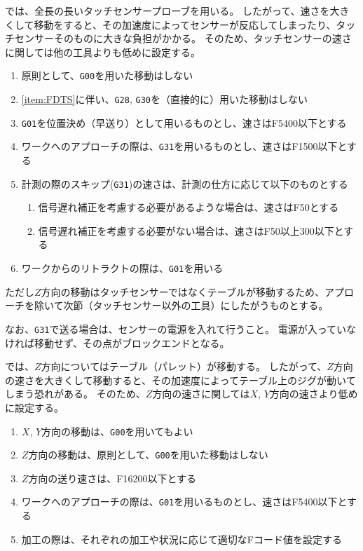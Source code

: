 \DMname では、全長の長いタッチセンサープローブを用いる。
したがって、速さを大きくして移動をすると、その加速度によってセンサーが反応してしまったり、タッチセンサーそのものに大きな負担がかかる。
そのため、タッチセンサーの速さに関しては他の工具よりも低めに設定する。
\begin{enumerate}[label=\Roman*., ref=\Roman*]
\item \label{item:FDTS} 原則として、\verb|G00|を用いた移動はしない
\item \ref{item:FDTS}に伴い、\verb|G28|, \verb|G30|を（直接的に）用いた移動はしない
\item \verb|G01|を位置決め（早送り）として用いるものとし、速さはF5400以下とする
\item ワークへのアプローチの際は、\verb|G31|を用いるものとし、速さはF1500以下とする
\item 計測の際のスキップ(\verb|G31|)の速さは、計測の仕方に応じて以下のものとする
  \begin{enumerate}
  \item {}信号遅れ補正を考慮する必要があるような場合は、速さはF50とする
  \item 信号遅れ補正を考慮する必要がない場合は、速さはF50以上300以下とする
  \end{enumerate}
\item ワークからのリトラクトの際は、\verb|G01|を用いる
\end{enumerate}
ただし$Z$方向の移動はタッチセンサーではなくテーブルが移動するため、アプローチを除いて次節（タッチセンサー以外の工具）にしたがうものとする。

なお、\verb|G31|で送る場合は、センサーの電源を入れて行うこと。
電源が入っていなければ移動せず、その点がブロックエンドとなる。



\clearpage
\DMname では、$Z$方向についてはテーブル（パレット）が移動する。
したがって、$Z$方向の速さを大きくして移動すると、その加速度によってテーブル上のジグが動いてしまう恐れがある。
そのため、$Z$方向の速さに関しては$X$, $Y$方向の速さより低めに設定する。
\begin{enumerate}[label=\Roman*., ref=\Roman*]
\item $X$, $Y$方向の移動は、\verb|G00|を用いてもよい
\item $Z$方向の移動は、原則として、\verb|G00|を用いた移動はしない
\item $Z$方向の送り速さは、F16200以下とする
\item ワークへのアプローチの際は、\verb|G01|を用いるものとし、速さはF5400以下とする
\item 加工の際は、それぞれの加工や状況に応じて適切なFコード値を設定する
\end{enumerate}


